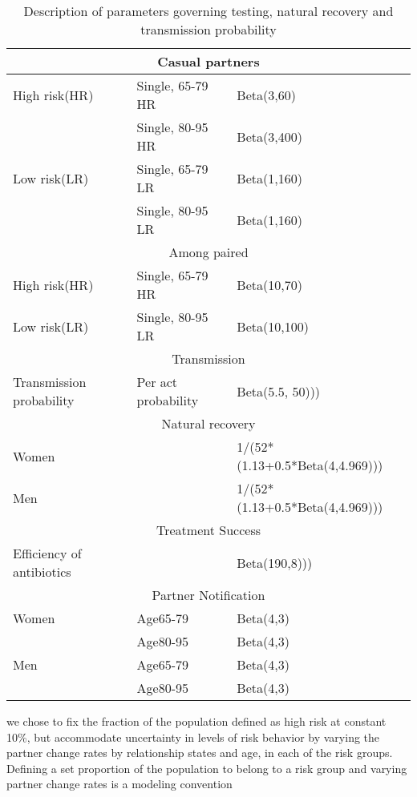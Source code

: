 \documentclass{article}
\begin{document}
\begin{normalsize}
\begin{table}[H]
\begin{tabular}{ |p{5cm}|p{7cm}|p{5cm}| }
			\multicolumn{3}{|c|}{Casual partners} \\
			\hline
			High risk(HR)& Single, 65-79 HR	& Beta(3,60)\\
 						 & Single, 80-95 HR	& Beta(3,400)\\
			Low risk(LR)	 & Single, 65-79 LR	& Beta(1,160) \\
 						 & Single, 80-95 LR	&Beta(1,160)\\
 			\hline
 			\multicolumn{3}{|c|}{Among paired} \\
 			\hline
			High risk(HR)& Single, 65-79 HR	& Beta(10,70)\\
			Low risk(LR) & Single, 80-95 LR	& Beta(10,100)\\
			\hline
			
		\multicolumn{3}{|c|}{Transmission} \\
			\hline
			Transmission probability &Per act probability & Beta(5.5, 50)))\\
    		\hline
    		
		\multicolumn{3}{|c|}{Natural recovery} \\
			\hline
			Women & & 1/(52*(1.13+0.5*Beta(4,4.969)))\\
			Men & & 1/(52*(1.13+0.5*Beta(4,4.969)))\\

    		\hline
    	
    	\multicolumn{3}{|c|}{Treatment Success} \\
    	    \hline
			Efficiency of antibiotics & & Beta(190,8)))\\
    		\hline

    	\multicolumn{3}{|c|}{Partner Notification} \\
    	    \hline
			Women&Age65-79&Beta(4,3)\\
			&Age80-95&Beta(4,3)
			\\
			Men&Age65-79&Beta(4,3)\\
			&Age80-95&Beta(4,3)\\
    		\hline
    
    		   		
    		
    		
    		
    	\end{tabular}
    	\label{tab:parameter}
    	\caption{Description of parameters governing testing, natural recovery and transmission probability}
   \end{table}
   
   	we chose to fix the fraction of the population defined as high risk at constant 10\%, but accommodate uncertainty in levels of risk behavior by varying the partner change rates by relationship states and age, in each of the risk groups. Defining a set proportion of the population to belong to a risk group and varying partner change rates is a modeling convention

    

	


\end{normalsize}
  
\end{document}

